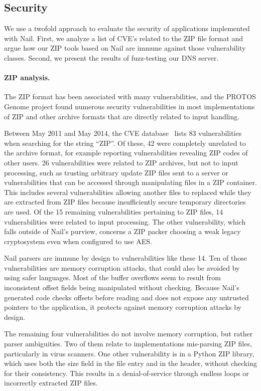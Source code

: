 \subsection{Security} 

We use a twofold approach to evaluate the security of applications
implemented with Nail. First, we analyze a list of CVE's related to the
ZIP file format and argue how our ZIP tools based on Nail are immune
against those vulnerability classes. Second, we present the results of
fuzz-testing our DNS server.

\paragraph{ZIP analysis.}

The ZIP format has been associated with many vulnerabilities, and the
PROTOS Genome project found numerous security vulnerabilities in most
implementations of ZIP and other archive formats that are directly
related to input handling.

Between May 2011 and May 2014, the CVE database~\cite{cve-database} lists
83 vulnerabilities when searching for the string ``ZIP''. Of these, 42
were completely unrelated to the archive format, for example reporting
vulnerabilities revealing ZIP codes of other users. 26 vulnerabilities
were related to ZIP archives, but not to input processing, such as
trusting arbitrary update ZIP files sent to a server or vulnerabilities
that can be accessed through manipulating files in a ZIP container. This
includes several vulnerabilities allowing another files to replaced while
they are extracted from ZIP files because insufficiently secure temporary
directories are used. Of the 15 remaining vulnerabilities pertaining
to ZIP files, 14 vulnerabilities were related to input processing. The
other vulnerability, which falls outside of Nail's purview, concerns a
ZIP packer choosing a weak legacy cryptosystem even when configured to
use AES.

Nail parsers are immune by design to vulnerabilities like these 14.
Ten of those vulnerabilities are memory corruption attacks, that could
also be avoided by using safer languages.  Most of the buffer overflows
seem to result from inconsistent offset fields being manipulated
without checking.  Because Nail's generated code checks offsets before
reading and does not expose any untrusted pointers to the application,
it protects against memory corruption attacks by design.

The remaining four vulnerabilities do not involve memory corruption,
but rather parser ambiguities.  Two of them relate to implementations
mis-parsing ZIP files, particularly in virus scanners. One other
vulnerability is in a Python ZIP library, which uses both the size
field in the file entry and in the header, without checking for their
consistency.  This results in a denial-of-service through endless loops
or incorrectly extracted ZIP files.


